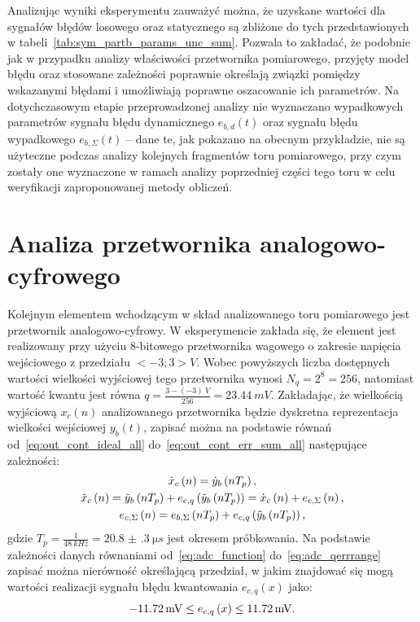 Analizując wyniki eksperymentu zauważyć można, że uzyskane wartości dla sygnałów błędów losowego oraz statycznego są zbliżone do tych przedstawionych w tabeli~\ref{tab:sym_partb_params_unc_sum}. Pozwala to zakładać, że podobnie jak w przypadku analizy właściwości przetwornika pomiarowego, przyjęty model błędu oraz stosowane zależności poprawnie określają związki pomiędzy wskazanymi błędami i umożliwiają poprawne oszacowanie ich parametrów. Na dotychczasowym etapie przeprowadzonej analizy nie wyznaczano wypadkowych parametrów sygnału błędu dynamicznego $e_{b,d}(t)$ oraz sygnału błędu wypadkowego $e_{b,\Sigma}(t)$ -- dane te, jak pokazano na obecnym przykładzie, nie są użyteczne podczas analizy kolejnych fragmentów toru pomiarowego, przy czym zostały one wyznaczone w ramach analizy poprzedniej części tego toru w celu weryfikacji zaproponowanej metody obliczeń.

\section{Analiza przetwornika analogowo-cyfrowego}

Kolejnym elementem wchodzącym w skład analizowanego toru pomiarowego jest przetwornik analogowo-cyfrowy. W eksperymencie zakłada się, że element jest realizowany przy użyciu 8-bitowego przetwornika wagowego o zakresie napięcia wejściowego z przedziału $<-3;3>\unit{V}$. Wobec powyższych liczba dostępnych wartości wielkości wyjściowej tego przetwornika wynosi $N_{q} = 2^{8} = 256$, natomiast wartość kwantu jest równa $q = \frac{3 - (-3)~\unit{V}}{256} = \qty{23.44}{mV}$. Zakładając, że wielkością wyjściową $x_{c}(n)$ analizowanego przetwornika będzie dyskretna reprezentacja wielkości wejściowej $y_{b}(t)$, zapisać można na podstawie równań od~\eqref{eq:out_cont_ideal_all} do~\eqref{eq:out_cont_err_sum_all} następujące zależności:
\begin{gather}
\dot{x}_{c} \left(n\right) = \dot{y}_{b} \left(nT_{p}\right) \label{eq:sym_partc_out_ideal}, \\
\tilde{x}_{c} \left(n\right) = \tilde{y}_{b} \left(nT_{p}\right) + e_{c,q} \left( \tilde{y}_{b} \left(nT_{p}\right) \right) = \dot{x}_{c} \left(n\right) + e_{c,\Sigma} \left(n\right) \label{eq:sym_partc_out_real}, \\
e_{c,\Sigma} \left(n\right) = e_{b,\Sigma} \left(nT_{p}\right) + e_{c,q} \left( \tilde{y}_{b} \left(nT_{p}\right) \right) \label{eq:sym_partc_error_sum},
\end{gather}
gdzie $T_{p} = \frac{1}{\qty{48}{kHz}} = \qty{20.8(3)}{\micro s}$ jest okresem próbkowania. Na podstawie zależności danych równaniami od~\eqref{eq:adc_function} do~\eqref{eq:adc_qerrrange} zapisać można nierówność określającą przedział, w jakim znajdować się mogą wartości realizacji sygnału błędu kwantowania $e_{c,q}(x)$ jako:
\begin{equation}
\qty{-11.72}{mV} \le e_{c,q} \left(x\right) \le \qty{11.72}{mV} \label{eq:sym_partc_error_quant}.
\end{equation}

